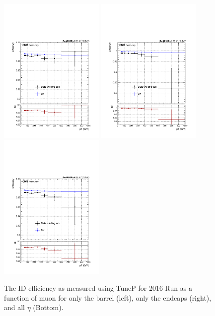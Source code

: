 \begin{figure}[htbp]
\centering
\includegraphics[width=0.45\textwidth]{Images/Cap5/Eff_FinalSel_Iso0p1_B2H_NoBkgSub_NoZwinNorm_Pt_B.pdf}
\includegraphics[width=0.45\textwidth]{Images/Cap5/Eff_FinalSel_Iso0p1_B2H_NoBkgSub_NoZwinNorm_Pt_E.pdf}
\includegraphics[width=0.45\textwidth]{Images/Cap5/Eff_FinalSel_Iso0p1_B2H_NoBkgSub_NoZwinNorm_Pt.pdf}
\caption{\label{fig:IDEffVsPt} The ID efficiency as measured using TuneP for 2016 Run as a function of muon \pt for only the barrel (left), only the endcaps (right), and all $\eta$ (Bottom).}
\end{figure}

